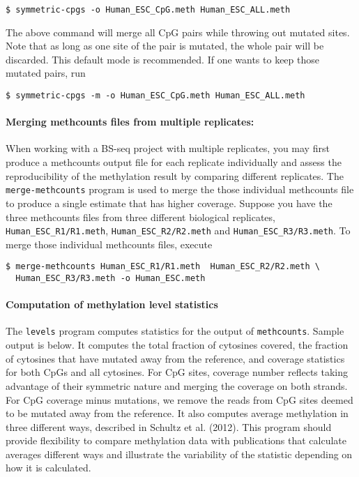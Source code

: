\documentclass[10pt]{article}
\newcommand{\prog}[1]{\texttt{#1}}
\newcommand{\fn}[1]{\texttt{#1}}
\begin{document}
\begin{verbatim}
$ symmetric-cpgs -o Human_ESC_CpG.meth Human_ESC_ALL.meth
\end{verbatim}

The above command will merge all CpG pairs while throwing out mutated sites.
Note that as long as one site of the pair is mutated, the whole pair will
be discarded. This default mode is recommended. If one wants to keep 
those mutated pairs, run

\begin{verbatim}
$ symmetric-cpgs -m -o Human_ESC_CpG.meth Human_ESC_ALL.meth
\end{verbatim}

\paragraph{Merging methcounts files from multiple replicates:}
\label{sec:merg-methc-file} 
When working with a BS-seq project with multiple replicates, you may
first produce a methcounts output file for each replicate individually
and assess the reproducibility of the methylation result by comparing
different replicates. The \prog{merge-methcounts} program is used to
merge the those individual methcounts file to produce a single
estimate that has higher coverage. Suppose you have the three
methcounts files from three different biological replicates,
\fn{Human\_ESC\_R1/R1.meth}, \fn{Human\_ESC\_R2/R2.meth} and
\fn{Human\_ESC\_R3/R3.meth}. To merge those individual methcounts files,
execute
\begin{verbatim}
$ merge-methcounts Human_ESC_R1/R1.meth  Human_ESC_R2/R2.meth \
  Human_ESC_R3/R3.meth -o Human_ESC.meth
\end{verbatim}

\paragraph{Computation of methylation level statistics}
The \prog{levels} program computes statistics for the output of
\prog{methcounts}. Sample output is below. It computes the total
fraction of cytosines covered, the fraction of cytosines that have
mutated away from the reference, and coverage statistics for both
CpGs and all cytosines. For CpG sites, coverage number reflects taking
advantage of their symmetric nature and merging the coverage on both
strands. For CpG coverage minus mutations, we remove the reads from
CpG sites deemed to be mutated away from the reference. It also computes
average methylation in three different ways, described in Schultz et al.
(2012). This program should provide flexibility to compare methylation data
with publications that calculate averages different ways and illustrate the
variability of the statistic depending on how it is calculated.
\end{document}
